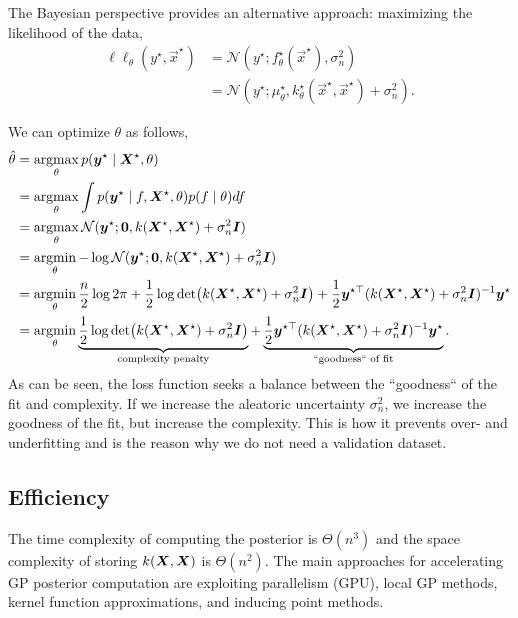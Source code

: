 The Bayesian perspective provides an alternative approach: maximizing the
likelihood of the data,
\begin{align*}
  \ell \ell_{\theta}(y^\star,\vec{x}^\star) &= \mathcal{N}(y^\star; f_{\theta}^\star(\vec{x}^\star), \sigma_n^2) \\
  &= \mathcal{N}(y^\star; \mu_{\theta}^\star, k_{\theta}^\star(\vec{x}^\star,\vec{x}^\star) + \sigma_n^2).
\end{align*}

We can optimize $\theta$ as follows,
\begin{align*}
  \hat{\theta} &= \argmax_\theta p(\bm{y}^\star\mid \mat{X}^\star, \theta) \\
  &= \argmax_\theta \int p(\bm{y}^\star\mid f,\mat{X}^\star, \theta) p(f\mid \theta) df \\
  &= \argmax_\theta \mathcal{N}(\bm{y}^\star; \bm{0}, k(\mat{X}^\star,\mat{X}^\star) + \sigma_n^2\bm{I}) \\
  &= \argmin_\theta -\log \mathcal{N}(\bm{y}^\star; \bm{0}, k(\mat{X}^\star,\mat{X}^\star) + \sigma_n^2\bm{I}) \\
  &= \argmin_\theta \frac{n}{2} \log 2\pi + \frac{1}{2}\log \det{k(\mat{X}^\star,\mat{X}^\star)+\sigma_n^2\bm{I}}+ \frac{1}{2}\bm{y}^{\star\top} (k(\mat{X}^\star,\mat{X}^\star) + \sigma_n^2\bm{I})^{-1}\bm{y}^\star \\
  &= \argmin_\theta \underbrace{\frac{1}{2}\log \det{k(\mat{X}^\star,\mat{X}^\star)+\sigma_n^2\bm{I}}}_{\text{complexity penalty}} + \underbrace{\frac{1}{2}\bm{y}^{\star\top} (k(\mat{X}^\star,\mat{X}^\star) + \sigma_n^2\bm{I})^{-1}\bm{y}^\star}_{\text{``goodness`` of fit}}.
\end{align*}
As can be seen, the loss function seeks a balance between the ``goodness`` of
the fit and complexity. If we increase the aleatoric uncertainty
$\sigma_n^2$, we increase the goodness of the fit, but increase the
complexity. This is how it prevents over- and underfitting and is the reason
why we do not need a validation dataset.


\subsection{Efficiency}

The time complexity of computing the posterior is $\Theta(n^3)$ and the space complexity of storing
$k(\bm{X},\bm{X})$ is $\Theta(n^2)$. The main approaches for accelerating GP
posterior computation are exploiting parallelism (GPU), local GP
methods, kernel function approximations, and inducing point methods.

